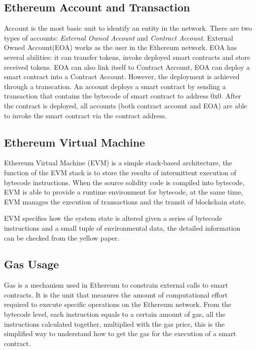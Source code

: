 \documentclass[sigplan,screen]{acmart}
\begin{document}
\subsection{Ethereum Account and Transaction}

Account is the most basic unit to identify an entity in the network. There are two types of accounts: \textit{External Owned Account} and \textit{Contract Account}. External Owned Account(EOA) works as the user in the Ethereum network. EOA has several abilities: it can transfer tokens, invoke deployed smart contracts and store received tokens. EOA can also link itself to Contract Account, EOA can deploy a smart contract into a Contract Account. However, the deployment is achieved through a transcation. An account deploys a smart contract by sending a transaction that contains the bytecode of smart contract to address 0x0. After the contract is deployed, all accounts (both contract account and EOA) are able to invoke the smart contract via the contract address.

\subsection{Ethereum Virtual Machine}

Ethereum Virtual Machine (EVM) is a simple stack-based architecture, the function of the EVM stack is to store the results of intermittent execution of bytecode instructions. When the source solidity code is compiled into bytecode, EVM is able to provide a runtime environment for bytecode, at the same time, EVM manages the execution of transactions and the transit of blockchain state.

EVM specifies how the system state is altered given a series of bytecode instructions and a small tuple of environmental data, the detailed information can be checked from the yellow paper\cite{wood2014ethereum}.

\subsection{Gas Usage}

Gas is a mechanism used in Ethereum to constrain external calls to smart contracts. It is the unit that measures the amount of computational effort required to execute specific operations on the Ethereum network. From the bytecode level, each instruction equals to a certain amount of gas, all the instructions calculated together, multiplied with the gas price, this is the simplified way to understand how to get the gas for the execution of a smart contract.
\end{document}
